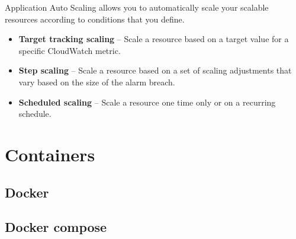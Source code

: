 		Application Auto Scaling allows you to automatically scale your scalable resources according to conditions that you define.
		\begin{itemize}
			\item \textbf{Target tracking scaling} – Scale a resource based on a target value for a specific CloudWatch metric.
			\item \textbf{Step scaling} – Scale a resource based on a set of scaling adjustments that vary based on the size of the alarm breach.
			\item \textbf{Scheduled scaling} – Scale a resource one time only or on a recurring schedule.
		\end{itemize}

\section{Containers}

	\subsection{Docker}

	\subsection{Docker compose}
